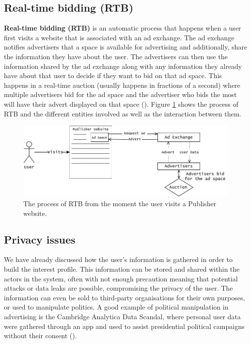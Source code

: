 \documentclass{l4proj}
\begin{document}
\subsection{Real-time bidding (RTB)}
\textbf{Real-time bidding (RTB)} is an automatic process that happens when a user first visits a website that is associated with an ad exchange. The ad exchange notifies advertisers that a space is available for advertising and additionally, share the information they have about the user. The advertisers can then use the information shared by the ad exchange along with any information they already have about that user to decide if they want to bid on that ad space. This happens in a real-time auction (usually happens in fractions of a second) where multiple advertisers bid for the ad space and the advertiser who bids the most will have their advert displayed on that space (\cite{RTB}). Figure \ref{fig:rtb} shows the process of RTB and the different entities involved as well as the interaction between them.

\begin{figure}
    \centering
    \includegraphics[width=1\linewidth]{images/RTB.pdf}    

    \caption{The process of RTB from the moment the user visits a Publisher website. }

    \label{fig:rtb} 
\end{figure}

\subsection{Privacy issues}
We have already discussed how the user's information is gathered in order to build the interest profile. This information can be stored and shared within the actors in the system, often with not enough precaution meaning that potential attacks or data leaks are possible, compromising the privacy of the user. The information can even be sold to third-party organisations for their own purposes, or used to manipulate politics. A good example of political manipulation in advertising is the Cambridge Analytica Data Scandal, where personal user data were gathered through an app and used to assist presidential political campaigns without their consent (\cite{cambridge}).
\end{document}
